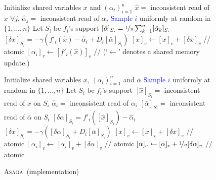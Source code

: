 \documentclass[twoside]{article}
\newcommand{\stepsize}{\gamma}
\newcommand{\ASAGA}{\textsc{Asaga}}
\begin{document}
\begin{figure*}[ttt!]
	\vspace{-5mm}
 \begin{minipage}[t]{0.49\textwidth}
   \begin{algorithm}[H]
     \caption{\ASAGA\ (analyzed algorithm)}
     \label{alg:theoretical}
     \label{theoreticalgo}
     \begin{algorithmic}[1]
	   \STATE Initialize shared variables $x$ and $(\alpha_i)_{i=1}^n$
	   \LOOP
	      \STATE $\hat x = $ inconsistent read of $x$
		  \STATE $\forall j$, $\hat \alpha_j = $ inconsistent read of $\alpha_j$
	   	  \STATE \textcolor{blue}{Sample $i$}  uniformly at random in $\{1,...,n\}$
	      \STATE Let $S_i$ be $f_i$'s support
	      \STATE $[\bar \alpha]_{S_i} = \nicefrac{1}{n} \sum_{k=1}^n [\hat \alpha_k]_{S_i}$
    		  \STATE $[\delta x]_{S_i} = -\stepsize (f'_i(\hat x) - \hat \alpha_i + D_{i} [\bar \alpha]_{S_i})$
    		  \STATE
        		 \STATE $[x]_v \leftarrow [x]_v + [\delta x]_v$      \hfill // atomic
	         \STATE $[\alpha_i]_v \leftarrow [f'_i( \hat x )]_v$
	         \STATE // {\small(`$\gets$' denotes a shared memory update.)}
    		  \ENDFOR
	   \ENDLOOP
	  \end{algorithmic}
    \end{algorithm}
 \end{minipage}
 \hfill
 \begin{minipage}[t]{0.5\textwidth}
    \begin{algorithm}[H]
      \caption{\ASAGA\ (implementation)}
      \label{alg:sagasync}
      \begin{algorithmic}[1]
	    \STATE Initialize shared variables $x$, $(\alpha_i)_{i=1}^n$ and $\bar \alpha$
	    \LOOP
	      \STATE \textcolor{blue}{Sample $i$} uniformly at random in $\{1,...,n\}$
  	      \STATE Let $S_i$ be $f_i$'s support
 	      \STATE $[\hat x]_{S_i} = $ inconsistent read of $x$ on $S_i$
	      \STATE $\hat \alpha_i = $ inconsistent read of $\alpha_i$
	      \STATE $[\bar \alpha]_{S_i} = $ inconsistent read of $\bar \alpha$ on $S_i$
	      \STATE $[\delta \alpha]_{S_i} = f'_i([\hat x]_{S_i}) - \hat \alpha_i$
	      \STATE $[\delta x]_{S_i} = - \gamma ([\delta\alpha]_{S_i} + D_i [\bar \alpha]_{S_i})$
	        \STATE $[x]_v \gets [x]_v + [\delta x]_v$  \hfill // atomic
	        \STATE $[\alpha_i]_v \gets [\alpha_i]_v + [\delta \alpha]_v$ \hfill // atomic
	        \STATE $[\bar \alpha]_v \gets [\bar \alpha]_v + \nicefrac{1}{n}[\delta \alpha]_v$ \hfill // atomic
	     \ENDFOR
	   \ENDLOOP
      \end{algorithmic}
    \end{algorithm}
 \end{minipage}
 	\vspace{-5mm}
\end{figure*}
\end{document}
